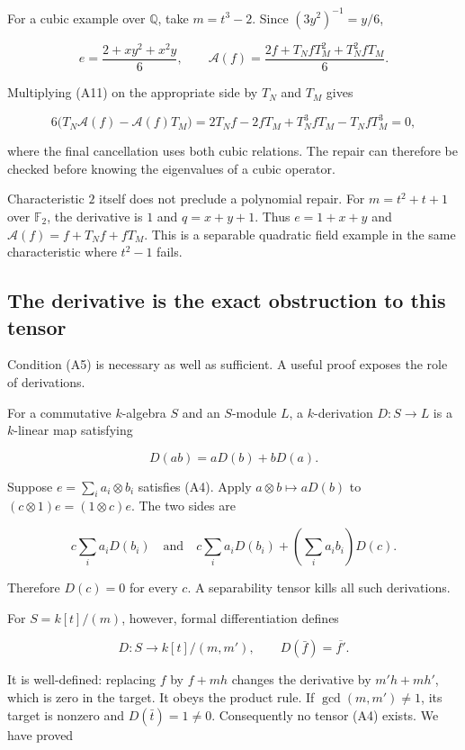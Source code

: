 \documentclass[
  11pt,
]{article}
\begin{document}
For a cubic example over \(\mathbb Q\), take \(m=t^3-2\). Since
\((3y^2)^{-1}=y/6\),

\[
e=\frac{2+x y^2+x^2y}{6},\qquad
\mathcal A(f)=\frac{2f+T_N fT_M^2+T_N^2fT_M}{6}.   \tag{A11}
\]

Multiplying (A11) on the appropriate side by \(T_N\) and \(T_M\) gives

\[
6\bigl(T_N\mathcal A(f)-\mathcal A(f)T_M\bigr)
=2T_Nf-2fT_M+T_N^3fT_M-T_NfT_M^3=0,
\]

where the final cancellation uses both cubic relations. The repair can
therefore be checked before knowing the eigenvalues of a cubic operator.

Characteristic \(2\) itself does not preclude a polynomial repair. For
\(m=t^2+t+1\) over \(\mathbb F_2\), the derivative is \(1\) and
\(q=x+y+1\). Thus \(e=1+x+y\) and \(\mathcal A(f)=f+T_N f+fT_M\). This
is a separable quadratic field example in the same characteristic where
\(t^2-1\) fails.

\subsection{The derivative is the exact obstruction to this
tensor}\label{the-derivative-is-the-exact-obstruction-to-this-tensor}

Condition (A5) is necessary as well as sufficient. A useful proof
exposes the role of derivations.

For a commutative \(k\)-algebra \(S\) and an \(S\)-module \(L\), a
\(k\)-derivation \(D:S\to L\) is a \(k\)-linear map satisfying

\[
D(ab)=aD(b)+bD(a).
\]

Suppose \(e=\sum_i a_i\otimes b_i\) satisfies (A4). Apply
\(a\otimes b\mapsto aD(b)\) to \((c\otimes1)e=(1\otimes c)e\). The two
sides are

\[
c\sum_i a_iD(b_i)
\quad\text{and}\quad
c\sum_i a_iD(b_i)+\left(\sum_i a_i b_i\right)D(c).
\]

Therefore \(D(c)=0\) for every \(c\). A separability tensor kills all
such derivations.

For \(S=k[t]/(m)\), however, formal differentiation defines

\[
D:S\longrightarrow k[t]/(m,m'),\qquad
D(\bar f)=\overline{f'}.                           \tag{A12}
\]

It is well-defined: replacing \(f\) by \(f+mh\) changes the derivative
by \(m'h+mh'\), which is zero in the target. It obeys the product rule.
If \(\gcd(m,m')\ne1\), its target is nonzero and \(D(\bar t)=1\ne0\).
Consequently no tensor (A4) exists. We have proved
\end{document}
